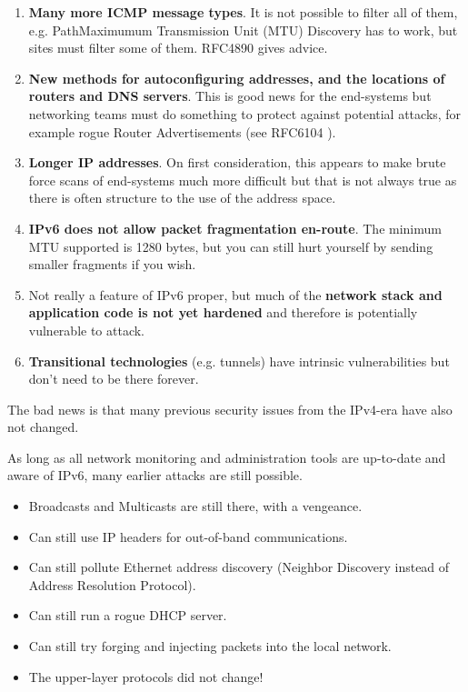\begin{enumerate}

\item {\bf Many more ICMP message types}. It is not possible to filter all of them, e.g. PathMaximumum Transmission Unit (MTU) Discovery has to work, but sites must filter some of them. RFC4890 \cite{rfc} gives advice.

\item {\bf New methods for autoconfiguring addresses, and the locations of routers and DNS servers}. This is good news for the end-systems but networking teams must do something to protect against potential attacks, for example rogue Router Advertisements (see RFC6104 \cite{rfc}).

\item {\bf Longer IP addresses}. On first consideration, this appears to make brute force scans of end-systems much more difficult but that is not always true as there is often structure to the use of the address space. 

\item {\bf IPv6 does not allow packet fragmentation en-route}. The minimum MTU supported is 1280 bytes, but you can still hurt yourself by sending smaller fragments if you wish. 

\item Not really a feature of IPv6 proper, but much of the {\bf network stack and application code is not yet hardened} and therefore is potentially vulnerable to attack.

\item {\bf Transitional technologies} (e.g. tunnels) have intrinsic vulnerabilities but don't need to be there forever.

\end{enumerate}

The bad news is that many previous security issues from the IPv4-era have also not changed. 

As long as all network monitoring and administration tools are up-to-date and aware of IPv6, many earlier attacks are still possible.

\begin {itemize}

\item Broadcasts and Multicasts are still there, with a vengeance.
\item Can still use IP headers for out-of-band communications.
\item Can still pollute Ethernet address discovery (Neighbor Discovery instead of Address Resolution Protocol).
\item Can still run a rogue DHCP server.
\item Can still try forging and injecting packets into the local network. 
\item The upper-layer protocols did not change!

\end {itemize}




